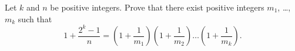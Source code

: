 Let  $k$ and $n$ be positive integers.
Prove that there exist positive integers $m_1$, \dots, $m_k$
such that
\[ 1 + \frac{2^k-1}{n} = \left( 1 + \frac{1}{m_1} \right) \left( 1 + \frac{1}{m_2} \right)
  \dots \left( 1 + \frac{1}{m_k} \right). \]